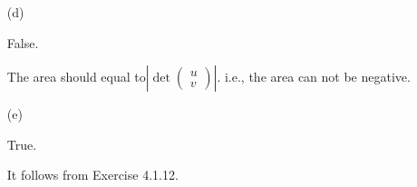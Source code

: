 \begin{Exercise}
\begin{enumerate}[(a)]
		\item[(d)]
		\begin{answer}
			False.
		\end{answer}
		\begin{solution}
			The area should equal to$\left| \det\begin{pmatrix}
			u \\
			v
			\end{pmatrix} \right|$. i.e., the area can not be negative.
		\end{solution}
		
		\item[(e)]
		\begin{answer}
			True.
		\end{answer}
		\begin{solution}
			It follows from Exercise 4.1.12.
		\end{solution}
		
	\end{enumerate}
\end{Exercise}